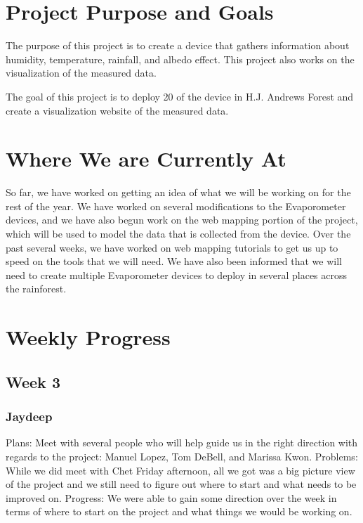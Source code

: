 \documentclass[onecolumn, draftclsnofoot,10pt, compsoc]{IEEEtran}
\begin{document}
\newpage
{}
\tableofcontents
\clearpage

\section{Project Purpose and Goals}
The purpose of this project is to create a device that gathers information about humidity, temperature, rainfall, and albedo effect. This project also works on the visualization of the measured data.

The goal of this project is to deploy 20 of the device in H.J. Andrews Forest and create a visualization website of the measured data.

\section{Where We are Currently At}
So far, we have worked on getting an idea of what we will be working on for the rest of the year. We have worked on several modifications to the Evaporometer devices, and we have also begun work on the web mapping portion of the project, which will be used to model the data that is collected from the device. Over the past several weeks, we have worked on web mapping tutorials to get us up to speed on the tools that we will need. We have also been informed that we will need to create multiple Evaporometer devices to deploy in several places across the rainforest.

\section{Weekly Progress}
\subsection{Week 3}
\subsubsection{Jaydeep}
Plans: Meet with several people who will help guide us in the right direction with regards to the project: Manuel Lopez, Tom DeBell, and Marissa Kwon. 
\newline
Problems: While we did meet with Chet Friday afternoon, all we got was a big picture view of the project and we still need to figure out where to start and what needs to be improved on.
\newline
Progress:   We were able to gain some direction over the week in terms of where to start on the project and what things we would be working on. 
\end{document}
